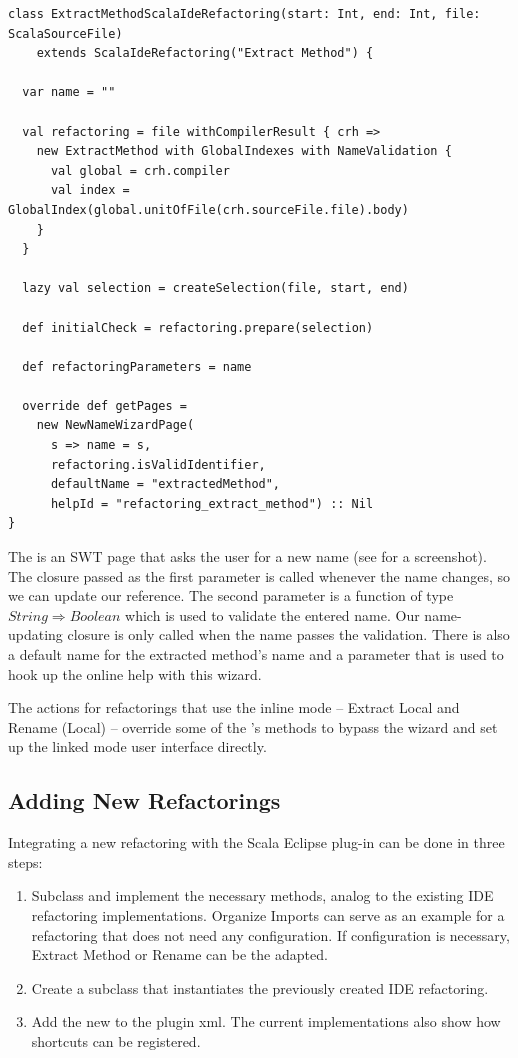 \documentclass[10pt,a4paper,oneside]{scrreprt}
\begin{document}
\newpage
\begin{lstlisting}
class ExtractMethodScalaIdeRefactoring(start: Int, end: Int, file: ScalaSourceFile) 
    extends ScalaIdeRefactoring("Extract Method") {
  
  var name = ""
  
  val refactoring = file withCompilerResult { crh => 
    new ExtractMethod with GlobalIndexes with NameValidation {
      val global = crh.compiler
      val index = GlobalIndex(global.unitOfFile(crh.sourceFile.file).body)
    }
  }

  lazy val selection = createSelection(file, start, end)

  def initialCheck = refactoring.prepare(selection)
  
  def refactoringParameters = name
  
  override def getPages = 
    new NewNameWizardPage(
      s => name = s, 
      refactoring.isValidIdentifier, 
      defaultName = "extractedMethod",
      helpId = "refactoring_extract_method") :: Nil 
}
\end{lstlisting}

The  is an SWT page that asks the user for a new name (see  for a screenshot). The closure passed as the first parameter is called whenever the name changes, so we can update our reference. The second parameter is a function of type $String \Rightarrow Boolean$ which is used to validate the entered name. Our name-updating closure is only called when the name passes the validation. There is also a default name for the extracted method's name and a  parameter that is used to hook up the online help with this wizard.

The actions for refactorings that use the inline mode -- Extract Local and Rename (Local) -- override some of the 's methods to bypass the wizard and set up the linked mode user interface directly.

\subsection{Adding New Refactorings}

Integrating a new refactoring with the Scala Eclipse plug-in can be done in three steps:

\begin{enumerate}
  \item Subclass  and implement the necessary methods, analog to the existing IDE refactoring implementations. Organize Imports can serve as an example for a refactoring that does not need any configuration. If configuration is necessary, Extract Method or Rename can be the adapted.
  \item Create a  subclass that instantiates the previously created IDE refactoring.
  \item Add the new  to the plugin xml. The current implementations also show how shortcuts can be registered.
\end{enumerate}
\end{document}
